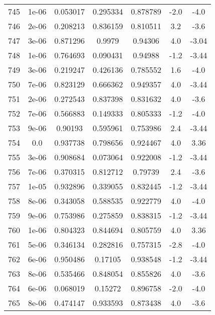 \begin{table}
\begin{tabular}{c|c|c|c|c|c|c}
745 & 1e-06 & 0.053017 & 0.295334 & 0.878789 & -2.0 & -4.0\\
746 & 2e-06 & 0.208213 & 0.836159 & 0.810511 & 3.2 & -3.6\\
747 & 3e-06 & 0.871296 & 0.9979 & 0.94306 & 4.0 & -3.04\\
748 & 1e-06 & 0.764693 & 0.090431 & 0.94988 & -1.2 & -3.44\\
749 & 3e-06 & 0.219247 & 0.426136 & 0.785552 & 1.6 & -4.0\\
750 & 7e-06 & 0.823129 & 0.666362 & 0.949357 & 4.0 & -3.44\\
751 & 2e-06 & 0.272543 & 0.837398 & 0.831632 & 4.0 & -3.6\\
752 & 7e-06 & 0.566883 & 0.149333 & 0.805333 & -1.2 & -4.0\\
753 & 9e-06 & 0.90193 & 0.595961 & 0.753986 & 2.4 & -3.44\\
754 & 0.0 & 0.937738 & 0.798656 & 0.924467 & 4.0 & 3.36\\
755 & 3e-06 & 0.908684 & 0.073064 & 0.922008 & -1.2 & -3.44\\
756 & 7e-06 & 0.370315 & 0.812712 & 0.79739 & 2.4 & -3.6\\
757 & 1e-05 & 0.932896 & 0.339055 & 0.832445 & -1.2 & -3.44\\
758 & 8e-06 & 0.343058 & 0.588535 & 0.922779 & 4.0 & -4.0\\
759 & 9e-06 & 0.753986 & 0.275859 & 0.838315 & -1.2 & -3.44\\
760 & 1e-06 & 0.804323 & 0.844694 & 0.805759 & 4.0 & 3.36\\
761 & 5e-06 & 0.346134 & 0.282816 & 0.757315 & -2.8 & -4.0\\
762 & 6e-06 & 0.950486 & 0.17105 & 0.938548 & -1.2 & -3.44\\
763 & 8e-06 & 0.535466 & 0.848054 & 0.855826 & 4.0 & -3.6\\
764 & 6e-06 & 0.068019 & 0.15272 & 0.896758 & -2.0 & -4.0\\
765 & 8e-06 & 0.474147 & 0.933593 & 0.873438 & 4.0 & -3.6\\
\end{tabular}
\end{table}
\newpage

